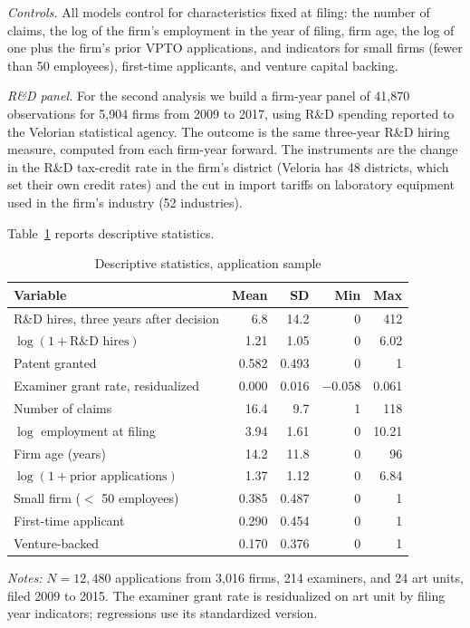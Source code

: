 \documentclass[11pt]{article}
\begin{document}
\textit{Controls.} All models control for characteristics fixed at filing: the number of claims, the log of the firm's employment in the year of filing, firm age, the log of one plus the firm's prior VPTO applications, and indicators for small firms (fewer than 50 employees), first-time applicants, and venture capital backing.

\textit{R\&D panel.} For the second analysis we build a firm-year panel of 41,870 observations for 5,904 firms from 2009 to 2017, using R\&D spending reported to the Velorian statistical agency. The outcome is the same three-year R\&D hiring measure, computed from each firm-year forward. The instruments are the change in the R\&D tax-credit rate in the firm's district (Veloria has 48 districts, which set their own credit rates) and the cut in import tariffs on laboratory equipment used in the firm's industry (52 industries).

Table~\ref{tab:desc} reports descriptive statistics.

\begin{table}[htbp]
\centering
\begin{threeparttable}
\caption{Descriptive statistics, application sample}
\label{tab:desc}
\small
\begin{tabular}{lrrrr}
\toprule
Variable & Mean & SD & Min & Max \\
\midrule
R\&D hires, three years after decision & 6.8 & 14.2 & 0 & 412 \\
$\log(1 + \text{R\&D hires})$ & 1.21 & 1.05 & 0 & 6.02 \\
Patent granted & 0.582 & 0.493 & 0 & 1 \\
Examiner grant rate, residualized & 0.000 & 0.016 & $-0.058$ & 0.061 \\
Number of claims & 16.4 & 9.7 & 1 & 118 \\
$\log$ employment at filing & 3.94 & 1.61 & 0 & 10.21 \\
Firm age (years) & 14.2 & 11.8 & 0 & 96 \\
$\log(1 + \text{prior applications})$ & 1.37 & 1.12 & 0 & 6.84 \\
Small firm ($<$ 50 employees) & 0.385 & 0.487 & 0 & 1 \\
First-time applicant & 0.290 & 0.454 & 0 & 1 \\
Venture-backed & 0.170 & 0.376 & 0 & 1 \\
\bottomrule
\end{tabular}
\begin{tablenotes}\footnotesize
\item \textit{Notes:} $N = 12{,}480$ applications from 3,016 firms, 214 examiners, and 24 art units, filed 2009 to 2015. The examiner grant rate is residualized on art unit by filing year indicators; regressions use its standardized version.
\end{tablenotes}
\end{threeparttable}
\end{table}
\end{document}

